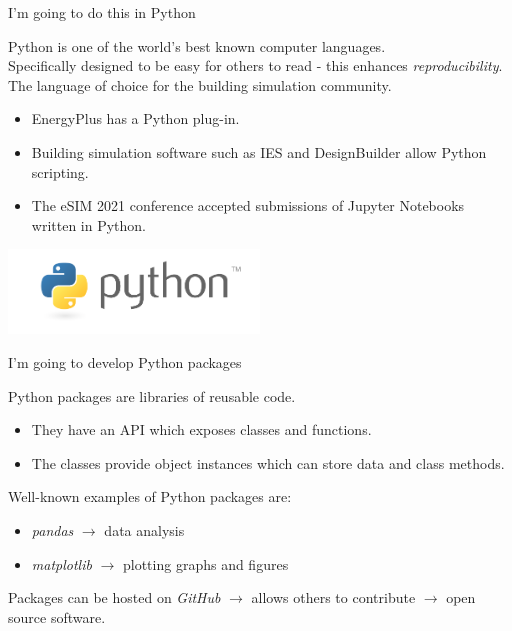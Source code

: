 \documentclass{beamer}
\begin{document}
	\begin{frame}{I'm going to do this in Python}
	
		Python is one of the world's best known computer languages.\\[10pt]
		
		Specifically designed to be easy for others to read - this enhances \textit{reproducibility}.\\[10pt]
		
		The language of choice for the building simulation community.
		\begin{itemize}
			\item EnergyPlus has a Python plug-in.
			\item Building simulation software such as IES and DesignBuilder allow Python scripting.
			\item The eSIM 2021 conference accepted submissions of Jupyter Notebooks written in Python.
		\end{itemize}
		
		\vspace{5pt}
		
		\centering
		\includegraphics[width=0.5\textwidth,keepaspectratio]{python-logo-master-v3-TM.png}
		
	\end{frame}


	\begin{frame}{I'm going to develop Python packages}

		Python packages are libraries of reusable code.
		\begin{itemize}
			\item They have an API which exposes classes and functions.
			\item The classes provide object instances which can store data and class methods.
		\end{itemize}

		\vspace{10pt}

		Well-known examples of Python packages are:
		\begin{itemize}
			\item \textit{pandas} $\rightarrow$ data analysis
			\item \textit{matplotlib} $\rightarrow$ plotting graphs and figures
		\end{itemize}
	
		\vspace{10pt}
	
		Packages can be hosted on \textit{GitHub} $\rightarrow$ allows others to contribute $\rightarrow$ open source software.

	\end{frame}
\end{document}
